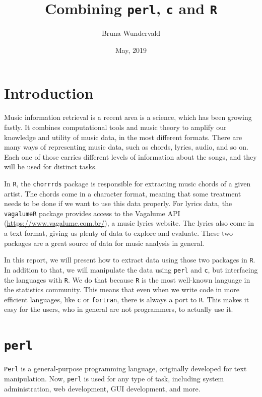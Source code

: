 \documentclass[]{article}
\title{Combining \texttt{perl}, \texttt{c} and \texttt{R}}
\author{Bruna Wundervald}
\date{May, 2019}
\begin{document}
\maketitle

\hypertarget{introduction}{%
\section{Introduction}\label{introduction}}

Music information retrieval is a recent area is a science, which has
been growing fastly. It combines computational tools and music theory to
amplify our knowledge and utility of music data, in the most different
formats. There are many ways of representing music data, such as chords,
lyrics, audio, and so on. Each one of those carries different levels of
information about the songs, and they will be used for distinct tasks.

In \texttt{R}, the \texttt{chorrrds} package is responsible for
extracting music chords of a given artist. The chords come in a
character format, meaning that some treatment needs to be done if we
want to use this data properly. For lyrics data, the \texttt{vagalumeR}
package provides access to the Vagalume API
(\url{https://www.vagalume.com.br/}), a music lyrics website. The lyrics
also come in a text format, giving us plenty of data to explore and
evaluate. These two packages are a great source of data for music
analysis in general.

In this report, we will present how to extract data using those two
packages in \texttt{R}. In addition to that, we will manipulate the data
using \texttt{perl} and \texttt{c}, but interfacing the languages with
\texttt{R}. We do that because \texttt{R} is the most well-known
language in the statistics community. This means that even when we write
code in more efficient languages, like \texttt{c} or \texttt{fortran},
there is always a port to \texttt{R}. This makes it easy for the users,
who in general are not programmers, to actually use it.

\hypertarget{perl}{%
\section{\texorpdfstring{\texttt{perl}}{perl}}\label{perl}}

\texttt{Perl} is a general-purpose programming language, originally
developed for text manipulation. Now, \texttt{perl} is used for any type
of task, including system administration, web development, GUI
development, and more.
\end{document}
